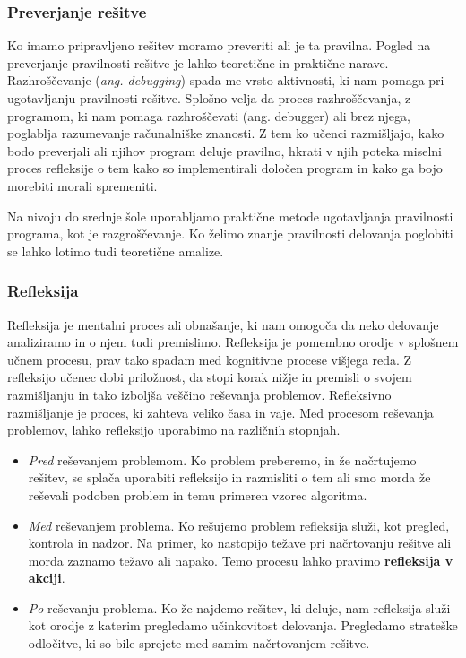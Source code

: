 \subsubsection{Preverjanje rešitve}
\label{sec:preverjanje_rešitve}
Ko imamo pripravljeno rešitev moramo preveriti ali je ta
pravilna. Pogled na preverjanje pravilnosti rešitve je lahko
teoretične in praktične narave. Razhroščevanje (\emph{ang. debugging})
spada me vrsto aktivnosti, ki nam pomaga pri ugotavljanju pravilnosti
rešitve. Splošno velja da proces razhroščevanja, z programom, ki nam
pomaga razhroščevati (ang. debugger) ali brez njega, poglablja
razumevanje računalniške znanosti. Z tem ko učenci razmišljajo, kako
bodo preverjali ali njihov program deluje pravilno, hkrati v njih
poteka miselni proces refleksije o tem kako so implementirali določen
program in kako ga bojo morebiti morali spremeniti.

Na nivoju do srednje šole uporabljamo praktične metode ugotavljanja
pravilnosti programa, kot je razgroščevanje. Ko želimo znanje
pravilnosti delovanja poglobiti se lahko lotimo tudi teoretične
amalize.

\subsubsection{Refleksija}
\label{sec:refleksije}

Refleksija je mentalni proces ali obnašanje, ki nam omogoča da neko
delovanje analiziramo in o njem tudi premislimo. Refleksija je
pomembno orodje v splošnem učnem procesu, prav tako spadam med
kognitivne procese višjega reda. Z refleksijo učenec dobi priložnost,
da stopi korak nižje in premisli o svojem razmišljanju in tako
izboljša veščino reševanja problemov. Refleksivno razmišljanje je
proces, ki zahteva veliko časa in vaje. Med procesom reševanja
problemov, lahko refleksijo uporabimo na različnih stopnjah.

\begin{itemize}
\item \emph{Pred} reševanjem problemom. Ko problem preberemo, in že
  načrtujemo rešitev, se splača uporabiti refleksijo in razmisliti o
  tem ali smo morda že reševali podoben problem in temu primeren
  vzorec algoritma.
\item \emph{Med} reševanjem problema. Ko rešujemo problem refleksija
  služi, kot pregled, kontrola in nadzor. Na primer, ko nastopijo
  težave pri načrtovanju rešitve ali morda zaznamo težavo ali
  napako. Temo procesu lahko pravimo \textbf{refleksija v akciji}.
\item \emph{Po} reševanju problema. Ko že najdemo rešitev, ki deluje,
  nam refleksija služi kot orodje z katerim pregledamo učinkovitost
  delovanja. Pregledamo strateške odločitve, ki so bile sprejete med
  samim načrtovanjem rešitve.
\end{itemize}

